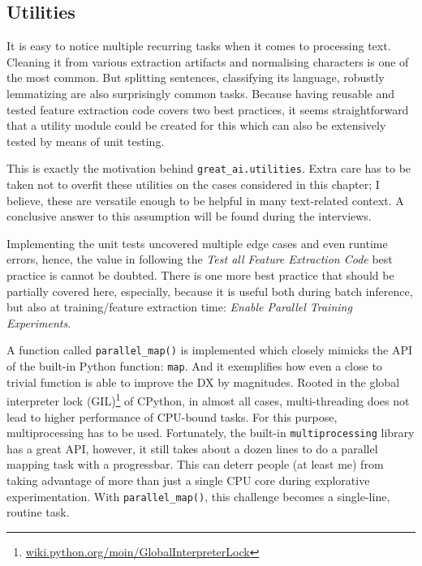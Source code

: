 


\subsection{Utilities}

It is easy to notice multiple recurring tasks when it comes to processing text. Cleaning it from various extraction artifacts and normalising characters is one of the most common. But splitting sentences, classifying its language, robustly lemmatizing are also surprisingly common tasks. Because having reusable and tested feature extraction code covers two best practices, it seems straightforward that a utility module could be created for this which can also be extensively tested by means of unit testing.

This is exactly the motivation behind \texttt{great\_ai.utilities}. Extra care has to be taken not to overfit these utilities on the cases considered in this chapter; I believe, these are versatile enough to be helpful in many text-related context. A conclusive answer to this assumption will be found during the interviews.

Implementing the unit tests uncovered multiple edge cases and even runtime errors, hence, the value in following the \textit{Test all Feature Extraction Code} best practice is cannot be doubted. There is one more best practice that should be partially covered here, especially, because it is useful both during batch inference, but also at training/feature extraction time:  \textit{Enable Parallel Training Experiments}. 

A function called \texttt{parallel\_map()} is implemented which closely mimicks the API of the built-in Python function: \texttt{map}. And it exemplifies how even a close to trivial function is able to improve the DX by magnitudes. Rooted in the global interpreter lock (GIL)\footnote{\href{https://wiki.python.org/moin/GlobalInterpreterLock}{wiki.python.org/moin/GlobalInterpreterLock}} of CPython, in almost all cases, multi-threading does not lead to higher performance of CPU-bound tasks. For this purpose, multiprocessing has to be used. Fortunately, the built-in \texttt{multiprocessing} library has a great API, however, it still takes about a dozen lines to do a parallel mapping task with a progressbar. This can deterr people (at least me) from taking advantage of more than just a single CPU core during explorative experimentation. With \texttt{parallel\_map()}, this challenge becomes a single-line, routine task. 
